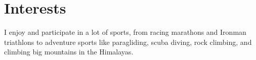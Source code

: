 \documentclass[letterpaper,10pt]{article}
\begin{document}
\section{Interests}
    I enjoy and participate in a lot of sports, from racing marathons and Ironman triathlons to adventure sports like paragliding, scuba diving, rock climbing, and climbing big mountains in the Himalayas.
\end{document}
